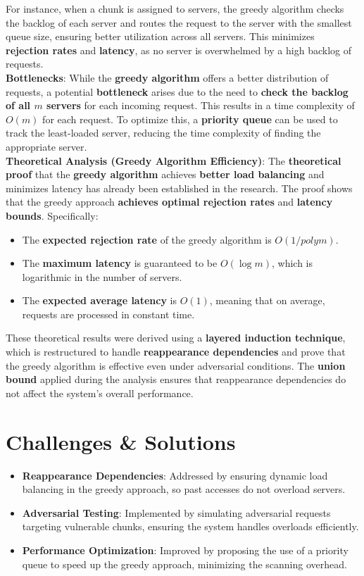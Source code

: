 \documentclass{article}
\begin{document}
For instance, when a chunk is assigned to servers, the greedy algorithm checks the backlog of each server and routes the request to the server with the smallest queue size, ensuring better utilization across all servers. This minimizes \textbf{rejection rates} and \textbf{latency}, as no server is overwhelmed by a high backlog of requests.\\

\textbf{Bottlenecks}:  
While the \textbf{greedy algorithm} offers a better distribution of requests, a potential \textbf{bottleneck} arises due to the need to \textbf{check the backlog of all $m$ servers} for each incoming request. This results in a time complexity of $O(m)$ for each request. To optimize this, a \textbf{priority queue} can be used to track the least-loaded server, reducing the time complexity of finding the appropriate server.\\

\textbf{Theoretical Analysis (Greedy Algorithm Efficiency)}:  
The \textbf{theoretical proof} that the \textbf{greedy algorithm} achieves \textbf{better load balancing} and minimizes latency has already been established in the research. The proof shows that the greedy approach \textbf{achieves optimal rejection rates} and \textbf{latency bounds}. Specifically:
\begin{itemize}
    \item The \textbf{expected rejection rate} of the greedy algorithm is $O(1/poly m)$.
    \item The \textbf{maximum latency} is guaranteed to be $O(\log m)$, which is logarithmic in the number of servers.
    \item The \textbf{expected average latency} is $O(1)$, meaning that on average, requests are processed in constant time.
\end{itemize}

These theoretical results were derived using a \textbf{layered induction technique}, which is restructured to handle \textbf{reappearance dependencies} and prove that the greedy algorithm is effective even under adversarial conditions. The \textbf{union bound} applied during the analysis ensures that reappearance dependencies do not affect the system's overall performance.



\section*{Challenges \& Solutions}
\begin{itemize}
    \item \textbf{Reappearance Dependencies}: Addressed by ensuring dynamic load balancing in the greedy approach, so past accesses do not overload servers.
    \item \textbf{Adversarial Testing}: Implemented by simulating adversarial requests targeting vulnerable chunks, ensuring the system handles overloads efficiently.
    \item \textbf{Performance Optimization}: Improved by proposing the use of a priority queue to speed up the greedy approach, minimizing the scanning overhead.
\end{itemize}
\end{document}
